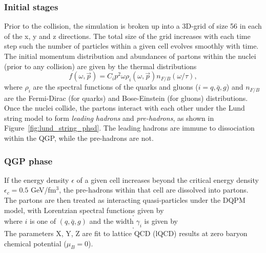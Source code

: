 \subsubsection{Initial stages}
Prior to the collision, the simulation is broken up into a 3D-grid of size 56 in each of the x, y and z directions. The total size of the grid increases with each time step such the number of particles within a given cell evolves smoothly with time. The initial momentum distribution and abundances of partons within the nuclei (prior to any collision) are given by the thermal distributions
\begin{equation}
    f(\omega, \vec{p}) = C_i p^2 \omega \rho_i(\omega, \vec{p}) n_{F / B}(\omega / \tau),
\end{equation}
where $\rho_i$ are the spectral functions of the quarks and gluons ($i = q, \bar{q}, g$) and $n_{F / B}$ are the Fermi-Dirac (for quarks) and Bose-Einstein (for gluons) distributions. Once the nuclei collide, the partons interact with each other under the Lund string model to form \textit{leading hadrons} and \textit{pre-hadrons}, as shown in Figure~\ref{fig:lund_string_phsd}. The leading hadrons are immune to dissociation within the QGP, while the pre-hadrons are not. 


\subsubsection{QGP phase}
If the energy density $\epsilon$ of a given cell increases beyond the critical energy density $\epsilon_c = 0.5$ GeV/fm$^3$, the pre-hadrons within that cell are dissolved into partons. The partons are then treated as interacting quasi-particles under the DQPM~\cite{DQPM} model, with Lorentzian spectral functions given by
\begin{equation}
.
\end{equation}
where $i$ is one of $(q, \bar{q}, g)$ and the width $\gamma_i$ is given by
\begin{equation}
.
\end{equation}
The parameters X, Y, Z are fit to lattice QCD (lQCD) results at zero baryon chemical potential ($\mu_B = 0$).


